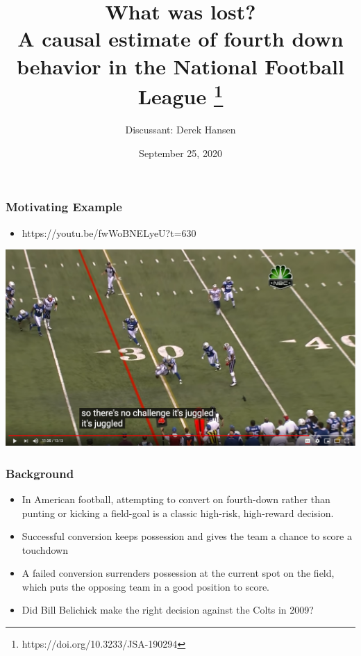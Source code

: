 \documentclass[t]{beamer}
\title[Causal Inference in NFL]{What was lost? \\ A causal estimate of fourth down behavior in the National Football League \footnote{https://doi.org/10.3233/JSA-190294}}
\author[Derek Hansen]{Discussant: Derek Hansen}
\institute[UM Statistics]{Sports Reading Group \\ University of Michigan Department of Statistics}
\date{September 25, 2020}
\begin{document}
\frame{\titlepage}

\begin{frame}
  \frametitle{Motivating Example}
  \begin{itemize}
  \item https://youtu.be/fwWoBNELyeU?t=630
  \end{itemize}
  \includegraphics[width=\linewidth]{./motivating_example.png}
\end{frame}

\begin{frame}
  \frametitle{Background}
  \begin{itemize}
  \item In American football, attempting to convert on fourth-down rather than
    punting or kicking a field-goal is a classic high-risk, high-reward
    decision.
    \item Successful conversion keeps possession and gives the team a chance to score a touchdown
    \item A failed conversion surrenders possession at the current spot on the field, which puts the opposing team in a good position to score.
    \item Did Bill Belichick make the right decision against the Colts in 2009?
  \end{itemize}
\end{frame}

\end{document}
